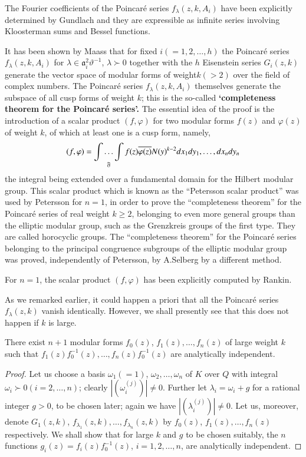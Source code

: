 The Fourier coefficients of the Poincar\'e series
$f_{\lambda}(z,k,A_{i})$ have been explicitly determined by Gundlach
and they are expressible as infinite series involving Kloosterman sums
and Bessel functions.

It has been shown by Maass that for fixed $i(=1,2,\ldots,h)$ the
Poin\-car\'e series $f_{\lambda}(z,k,A_{i})$ for
$\lambda\in\mathfrak{a}^{2}_{i}\vartheta^{-1}$, $\lambda \succ 0$ together
with the $h$ Eisenstein series $G_{i}(z,k)$ generate the vector space
of modular forms of weight\pageoriginale $k(>2)$ over the field of
complex numbers. The Poincar\'e series $f_{\lambda}(z,k,A_{i})$
themselves generate the subspace of all cusp forms of weight $k$; this
is the so-called {\bf`completeness theorem for the Poincar\'e
  series'.} The essential idea of the proof is the introduction of a
scalar product $(f,\varphi)$ for two modular forms $f(z)$ and
$\varphi(z)$ of weight $k$, of which at least one is a cusp form,
namely,
$$
(f,\varphi)=\mathop{\int\ldots\int}_{\mathfrak{F}}f(z)\overline{\varphi(z)}N(y)^{k-2}dx_{1}dy_{1},\ldots,dx_{n}dy_{n}
$$
the integral being extended over a fundamental domain for the Hilbert
modular group. This scalar product which is known as the ``Petersson
scalar product'' was used by Petersson for $n=1$, in order to prove
the ``completeness theorem'' for the Poincar\'e series of real weight
$k\geq 2$, belonging to even more general groups than the elliptic
modular group, such as the Grenzkreis groups of the first type. They
are called horocyclic groups. The ``completeness theorem'' for the
Poincar\'e series belonging to the principal congruence subgroups of
the elliptic modular group was proved, independently of Petersson, by
A.\@ Selberg by a different method.

For $n=1$, the scalar product $(f,\varphi)$ has been explicitly
computed by Rankin.

As we remarked earlier, it could happen a priori that all the
Poincar\'e series $f_{\lambda}(z,k)$ vanish identically. However, we
shall presently see that this does not happen if $k$ is large.

\begin{proposition}\label{prop27}
There exist $n+1$ modular forms $f_{0}(z)$, $f_{1}(z),\ldots,f_{n}(z)$
of large weight $k$ such that
$f_{1}(z)f^{-1}_{0}(z),\ldots,f_{n}(z)f^{-1}_{0}(z)$ are analytically
independent.
\end{proposition}

\begin{proof}
Let us choose a basis $\omega_{1}(=1)$, $\omega_{2},\ldots,\omega_{n}$
of $K$ over $Q$ with integral $\omega_{i} \succ 0(i=2,\ldots,n)$; clearly
$|(\omega^{(j)}_{i})|\neq 0$. Further let $\lambda_{i}=\omega_{i}+g$
for a rational integer $g>0$, to be chosen later; again we have
$|(\lambda^{(j)}_{i})|\neq 0$. Let us, moreover, denote $G_{1}(z,k)$,
$f_{\lambda_{1}}(z,k),\ldots,f_{\lambda_{n}}(z,k)$ by $f_{0}(z)$,
$f_{1}(z),\ldots,f_{n}(z)$ respectively. We shall show that for large
$k$ and $g$ to be chosen suitably, the $n$ functions
$g_{i}(z)=f_{i}(z)f^{-1}_{0}(z)$, $i=1,2,\ldots,n$, are analytically
independent.
\end{proof}

